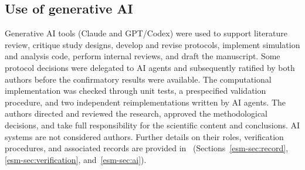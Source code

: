 \subsection{Use of generative AI}\label{sec:ai-use}

Generative AI tools (Claude and GPT/Codex) were used to support literature review, critique study designs, develop and revise protocols, implement simulation and analysis code, perform internal reviews, and draft the manuscript. Some protocol decisions were delegated to AI agents and subsequently ratified by both authors before the confirmatory results were available. The computational implementation was checked through unit tests, a prespecified validation procedure, and two independent reimplementations written by AI agents. The authors directed and reviewed the research, approved the methodological decisions, and take full responsibility for the scientific content and conclusions. AI systems are not considered authors. Further details on their roles, verification procedures, and associated records are provided in \esmresource\ (Sections~\ref{esm-sec:record}, \ref{esm-sec:verification}, and~\ref{esm-sec:ai}).
